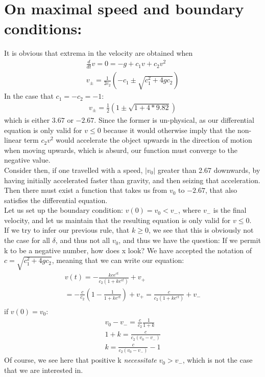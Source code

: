\documentclass[english,a4paper,oneside,article,9pt]{memoir}
\begin{document}
\section{On maximal speed and boundary conditions:}
It is obvious that extrema in the velocity are obtained when
\begin{align*}
\frac{d}{dt} v=0=-g+c_1v+c_2v^2\\
v_\pm=\frac{1}{2c_2}(-c_1\pm\sqrt{c_1^2+4gc_2})
\end{align*}
In the case that $c_1=-c_2=-1$:
\begin{align*}
v_\pm=\frac{1}{2}(1\pm\sqrt{1+4*9.82})
\end{align*}
which is either $3.67$ or $-2.67$.
Since the former is un-physical, as our differential equation is only valid for $v\leq 0$ because it would otherwise imply that the non-linear term $c_2v^2$ would accelerate the object upwards in the direction of motion when moving upwards, which is absurd, our function must converge to the negative value.\\
Consider then, if one travelled with a speed, $|v_0|$ greater than 2.67 downwards, by having initially accelerated faster than gravity, and then seizing that acceleration. Then there must exist a function that takes us from $v_0$ to $-2.67$, that also satisfies the differential equation.\\
Let us set up the boundary condition: $v(0)=v_0<v_{-}$, where $v_-$ is the final velocity, and let us maintain that the resulting equation is only valid for $v\leq 0$.\\
If we try to infer our previous rule, that $k\geq 0$, we see that this is obviously not the case for all $\delta$, and thus not all $v_0$, and thus we have the question: If we permit k to be a negative number, how does x look?
We have accepted the notation of $c=\sqrt{c_1^2+4gc_2}$, meaning that we can write our equation:
\begin{align*}
v(t)=-\frac{kce^{ct}}{c_2(1+ke^{ct})}+v_+\\
=-\frac{c}{c_2}(1-\frac{1}{1+ke^{ct}})+v_+=\frac{c}{c_2(1+ke^{ct})}+v_-\\
\end{align*}
if $v(0)=v_0$:
\begin{align*}
v_0-v_-=\frac{c}{c_2}\frac{1}{1+k}\\
1+k=\frac{c}{c_2(v_0-v_-)}\tag{assuming $v_0\neq v_-$}\\
k=\frac{c}{c_2(v_0-v_-)}-1
\end{align*}
Of course, we see here that positive k \textit{necessitate} $v_0>v_-$, which is not the case that we are interested in.\\
\end{document}

